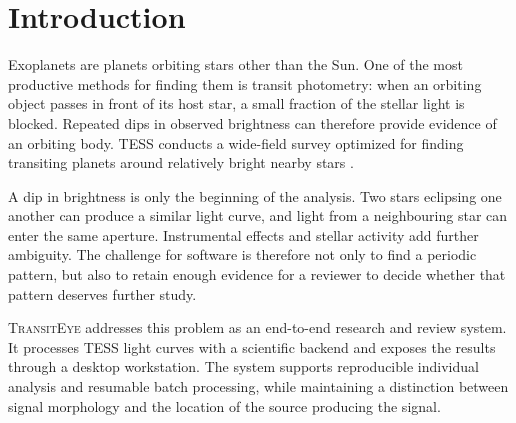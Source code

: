 \documentclass[11pt,a4paper]{article}
\newcommand{\project}{\textsc{TransitEye}}
\begin{document}
\tableofcontents
\newpage
\begin{abstract}
The Transiting Exoplanet Survey Satellite (TESS) records stellar brightness over time. Small, repeated drops in brightness can indicate a transit, but stellar activity, instrumental effects, and eclipsing binaries can produce similar patterns. This paper presents \project, a software system for detecting and reviewing such signals in TESS light curves. A Python backend handles data preparation, period searches, candidate fitting, and classification; a separate PyQt desktop application presents the results for inspection. The design uses versioned result bundles, source-grouped data partitions, and resumable batch processing to support reproducible analysis. Box Least Squares locates periodic dips, while complementary variability analysis, uncertainty estimates, and spatial checks help reviewers assess each candidate. The discussion connects these algorithms to the software decisions needed to run, inspect, and reproduce an analysis. A transit-like signal is treated as a candidate, not as confirmation of a planet.
\end{abstract}
\newpage
\section{Introduction}
Exoplanets are planets orbiting stars other than the Sun. One of the most productive methods for finding them is transit photometry: when an orbiting object passes in front of its host star, a small fraction of the stellar light is blocked. Repeated dips in observed brightness can therefore provide evidence of an orbiting body. TESS conducts a wide-field survey optimized for finding transiting planets around relatively bright nearby stars \cite{ricker}.

A dip in brightness is only the beginning of the analysis. Two stars eclipsing one another can produce a similar light curve, and light from a neighbouring star can enter the same aperture. Instrumental effects and stellar activity add further ambiguity. The challenge for software is therefore not only to find a periodic pattern, but also to retain enough evidence for a reviewer to decide whether that pattern deserves further study.

\project{} addresses this problem as an end-to-end research and review system. It processes TESS light curves with a scientific backend and exposes the results through a desktop workstation. The system supports reproducible individual analysis and resumable batch processing, while maintaining a distinction between signal morphology and the location of the source producing the signal.
\end{document}
